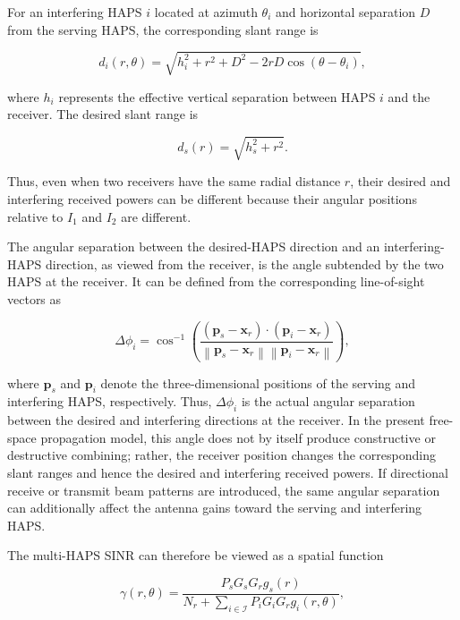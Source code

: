 \documentclass[conference]{IEEEtran}
\begin{document}
For an interfering HAPS $i$ located at azimuth $\theta_i$ and horizontal separation $D$ from the serving HAPS, the corresponding slant range is

\begin{equation}
d_i(r,\theta)
=
\sqrt{
 h_i^2
 + r^2
 + D^2
 -2rD\cos(\theta-\theta_i)
},
\label{eq:interferer-slant-range}
\end{equation}

where $h_i$ represents the effective vertical separation between HAPS $i$ and the receiver. The desired slant range is

\begin{equation}
d_s(r)
=
\sqrt{h_s^2+r^2}.
\label{eq:desired-slant-range}
\end{equation}

Thus, even when two receivers have the same radial distance $r$, their desired and interfering received powers can be different because their angular positions relative to $I_1$ and $I_2$ are different.

The angular separation between the desired-HAPS direction and an interfering-HAPS direction, as viewed from the receiver, is the angle subtended by the two HAPS at the receiver. It can be defined from the corresponding line-of-sight vectors as

\begin{equation}
\Delta\phi_i
=
\cos^{-1}
\left(
\frac{
(\mathbf{p}_s-\mathbf{x}_r)\cdot(\mathbf{p}_i-\mathbf{x}_r)
}{
\left\|\mathbf{p}_s-\mathbf{x}_r\right\|
\left\|\mathbf{p}_i-\mathbf{x}_r\right\|
}
\right),
\label{eq:angular-subtend}
\end{equation}

where $\mathbf{p}_s$ and $\mathbf{p}_i$ denote the three-dimensional positions of the serving and interfering HAPS, respectively. Thus, $\Delta\phi_i$ is the actual angular separation between the desired and interfering directions at the receiver. In the present free-space propagation model, this angle does not by itself produce constructive or destructive combining; rather, the receiver position changes the corresponding slant ranges and hence the desired and interfering received powers. If directional receive or transmit beam patterns are introduced, the same angular separation can additionally affect the antenna gains toward the serving and interfering HAPS.

The multi-HAPS SINR can therefore be viewed as a spatial function

\begin{equation}
\gamma(r,\theta)
=
\frac{
P_sG_sG_r g_s(r)
}{
N_r
+
\displaystyle\sum_{i\in\mathcal{I}}
P_iG_iG_r g_i(r,\theta)
},
\label{eq:spatial-sinr}
\end{equation}
\end{document}
